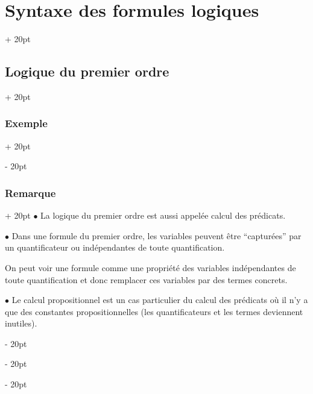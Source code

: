 \documentclass[a4paper, 12pt, twoside]{article}
\newcommand{\ind}[1][20pt]{\advance\leftskip + #1}
\newcommand{\deind}[1][20pt]{\advance\leftskip - #1}
\newenvironment{indt}[2][20pt]{#2 \par \ind[#1]}{\par \deind} %
\begin{document}
\begin{indt}{\section{Syntaxe des formules logiques}}
\begin{indt}{\subsection{Logique du premier ordre}}
\begin{indt}{\subsubsection{Exemple}}
\begin{center}
                \end{center}
            \end{indt}
            
            \vspace{12pt}
            
            \begin{indt}{\subsubsection{Remarque}}
                $\bullet$ La logique du premier ordre est aussi appelée calcul des prédicats.
                
                \vspace{12pt}
                
                $\bullet$ Dans une formule du premier ordre, les variables peuvent être ``capturées'' par un quantificateur ou indépendantes de toute quantification.
                
                On peut voir une formule comme une propriété des variables indépendantes de toute quantification et donc remplacer ces variables par des termes concrets.
                
                \vspace{12pt}
                
                $\bullet$ Le calcul propositionnel est un cas particulier du calcul des prédicats où il n'y a que des constantes propositionnelles (les quantificateurs et les termes deviennent inutiles).
            \end{indt}
        \end{indt}
        
    \end{indt}

    
    
    
\end{document}
